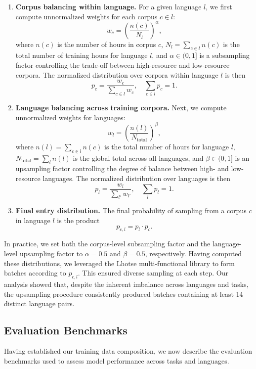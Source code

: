 \begin{enumerate}
  \item \textbf{Corpus balancing within language.}  
  For a given language $l$, we first compute unnormalized weights for each corpus $c \in l$:
  \[
  w_c = \left(\frac{n(c)}{N_l}\right)^{\alpha},
  \]
  where $n(c)$ is the number of hours in corpus $c$, $N_l = \sum_{c \in l} n(c)$ is the total number of training hours for language $l$, and $\alpha \in (0,1]$ is a subsampling factor controlling the trade-off between high-resource and low-resource corpora.  
  The normalized distribution over corpora within language $l$ is then
  \[
  p_c = \frac{w_c}{\sum_{c \in l} w_c}, \quad \sum_{c \in l} p_c = 1 .
  \]

  \item \textbf{Language balancing across training corpora.}  
  Next, we compute unnormalized weights for languages:
  \[
  w_l = \left(\frac{n(l)}{N_\text{total}}\right)^{\beta},
  \]
  where $n(l) = \sum_{c \in l} n(c)$ is the total number of hours for language $l$, $N_\text{total} = \sum_l n(l)$ is the global total across all languages, and $\beta \in (0,1]$ is an upsampling factor controlling the degree of balance between high- and low-resource languages.  
  The normalized distribution over languages is then
  \[
  p_l = \frac{w_l}{\sum_{l'} w_{l'}}, \quad \sum_l p_l = 1 .
  \]

  \item \textbf{Final entry distribution.}  
  The final probability of sampling from a corpus $c$ in language $l$ is the product
  \[
  p_{c,l} = p_l \cdot p_c .
  \]
\end{enumerate}

In practice, we set both the corpus-level subsampling factor and the language-level upsampling factor to $\alpha = 0.5$ and $\beta = 0.5$, respectively. Having computed these distributions, we leveraged the Lhotse multi-functional library \cite{lhotse} to form batches according to $p_{c,l}$. This ensured diverse sampling at each step. Our analysis showed that, despite the inherent imbalance across languages and tasks, the upsampling procedure consistently produced batches containing at least 14 distinct language pairs.

\subsection{Evaluation Benchmarks}
\label{sec:evaluation-benchmarks}

Having established our training data composition, we now describe the evaluation benchmarks used to assess model performance across tasks and languages.

